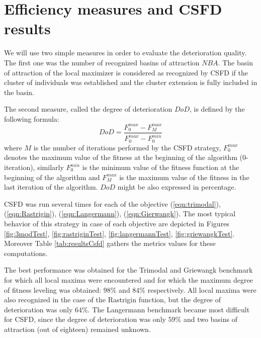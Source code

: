 \section{Efficiency measures and CSFD results}
\label{sec:Measures}
We will use two simple measures in order to evaluate the deterioration
quality. The first one was the number of recognized basins of
attraction $NBA$.
The basin of attraction of the local maximizer is considered as recognized
by CSFD if the cluster of individuals was established and 
the cluster extension is fully included in the basin.


The second measure, called the degree of deterioration $DoD$, is
defined by the following formula:
\begin{equation}
\label{eq:dod}
DoD = \frac{F_0^{max} - F_M^{max}}{F_0^{max} - F_0^{min}}
\end{equation}
where $M$ is the number of iterations performed by the CSFD strategy, 
$F_0^{max}$ denotes the maximum value of the fitness at the beginning of the 
algorithm ($0$-iteration), similarly $F_0^{min}$ is the minimum value of the
fitness function at the beginning of the algorithm and $F_M^{max}$ is the 
maximum value of the fitness in the last iteration of the algorithm.
$DoD$ might be also expressed in percentage.

CSFD was run several times for each of the objective (\ref{eqn:trimodal}),
(\ref{eqn:Rastrigin}), (\ref{eqn:Langermann}), (\ref{eqn:Gierwangk}).
The most typical behavior of this strategy in case of each objective
are depicted in Figures \ref{fig:3modTest},
\ref{fig:rastriginTest}, \ref{fig:langermannTest}, \ref{fig:griewangkTest}.
Moreover Table \ref{tab:resultsCsfd} gathers the metrics values for these
computations.

The best performance was obtained for the Trimodal and Griewangk
benchmark for which all local maxima were encountered and for which the maximum degree 
of fitness leveling was obtained: $98\%$ and $84\%$ respectively.
All local maxima were also recognized in the case of the Rastrigin function,
but the degree of deterioration was only $64\%$. The Langermann benchmark
became most difficult for CSFD, since the degree of deterioration was only
$59\%$ and two basins of attraction (out of eighteen) remained unknown. 

